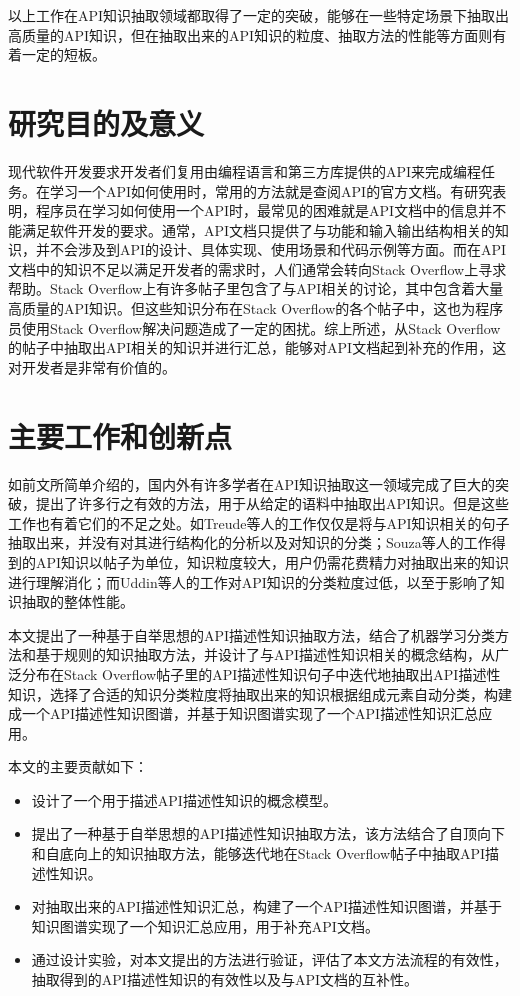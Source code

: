 以上工作在API知识抽取领域都取得了一定的突破，能够在一些特定场景下抽取出高质量的API知识，但在抽取出来的API知识的粒度、抽取方法的性能等方面则有着一定的短板。

\section{研究目的及意义}
现代软件开发要求开发者们复用由编程语言和第三方库提供的API来完成编程任务。在学习一个API如何使用时，常用的方法就是查阅API的官方文档。有研究表明，程序员在学习如何使用一个API时，最常见的困难就是API文档中的信息并不能满足软件开发的要求\cite{DBLP:journals/ese/RobillardD11}。通常，API文档只提供了与功能和输入输出结构相关的知识，并不会涉及到API的设计、具体实现、使用场景和代码示例等方面。而在API文档中的知识不足以满足开发者的需求时，人们通常会转向Stack Overflow上寻求帮助。Stack Overflow上有许多帖子里包含了与API相关的讨论，其中包含着大量高质量的API知识。但这些知识分布在Stack Overflow的各个帖子中，这也为程序员使用Stack Overflow解决问题造成了一定的困扰。综上所述，从Stack Overflow的帖子中抽取出API相关的知识并进行汇总，能够对API文档起到补充的作用，这对开发者是非常有价值的。

\section{主要工作和创新点}
如前文所简单介绍的，国内外有许多学者在API知识抽取这一领域完成了巨大的突破，提出了许多行之有效的方法，用于从给定的语料中抽取出API知识。但是这些工作也有着它们的不足之处。如Treude等人\cite{DBLP:conf/icse/TreudeR16}的工作仅仅是将与API知识相关的句子抽取出来，并没有对其进行结构化的分析以及对知识的分类；Souza等人\cite{DBLP:journals/infsof/SouzaCDPRM19}的工作得到的API知识以帖子为单位，知识粒度较大，用户仍需花费精力对抽取出来的知识进行理解消化；而Uddin等人\cite{DBLP:journals/tse/UddinK21}的工作对API知识的分类粒度过低，以至于影响了知识抽取的整体性能。

本文提出了一种基于自举思想的API描述性知识抽取方法，结合了机器学习分类方法和基于规则的知识抽取方法，并设计了与API描述性知识相关的概念结构，从广泛分布在Stack Overflow帖子里的API描述性知识句子中迭代地抽取出API描述性知识，选择了合适的知识分类粒度将抽取出来的知识根据组成元素自动分类，构建成一个API描述性知识图谱，并基于知识图谱实现了一个API描述性知识汇总应用。

本文的主要贡献如下：
\begin{itemize}
    \item 设计了一个用于描述API描述性知识的概念模型。
    \item 提出了一种基于自举思想的API描述性知识抽取方法，该方法结合了自顶向下和自底向上的知识抽取方法，能够迭代地在Stack Overflow帖子中抽取API描述性知识。
    \item 对抽取出来的API描述性知识汇总，构建了一个API描述性知识图谱，并基于知识图谱实现了一个知识汇总应用，用于补充API文档。
    \item 通过设计实验，对本文提出的方法进行验证，评估了本文方法流程的有效性，抽取得到的API描述性知识的有效性以及与API文档的互补性。
\end{itemize}

